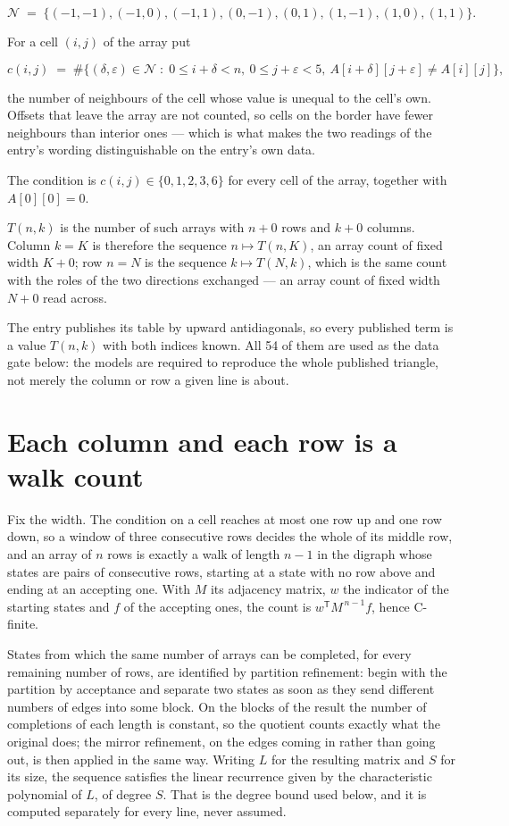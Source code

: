 \documentclass[11pt]{article}
\theoremstyle{definition}
\begin{document}
\[\mathcal{N} \;=\; \{(-1,-1), (-1,0), (-1,1), (0,-1), (0,1), (1,-1), (1,0), (1,1)\}.\]

For a cell $(i,j)$ of the array put

\[c(i,j) \;=\; \#\bigl\{(\delta,\varepsilon)\in\mathcal{N} \;:\; 0\le i+\delta<n,\ 0\le j+\varepsilon<5,\ A[i+\delta][j+\varepsilon] \neq A[i][j]\bigr\},\]

the number of neighbours of the cell whose value is unequal to the cell's own. Offsets that leave the array are not counted, so cells on the border have fewer neighbours than interior ones --- which is what makes the two readings of the entry's wording distinguishable on the entry's own data.

The condition is $c(i,j) \in \{0, 1, 2, 3, 6\}$ for every cell of the array, together with $A[0][0]=0$.

$T(n,k)$ is the number of such arrays with $n + 0$ rows and $k + 0$ columns. Column $k = K$ is therefore the sequence $n \mapsto T(n,K)$, an array count of fixed width $K + 0$; row $n = N$ is the sequence $k \mapsto T(N,k)$, which is the same count with the roles of the two directions exchanged --- an array count of fixed width $N + 0$ read across.

The entry publishes its table by upward antidiagonals, so every published term is a value $T(n,k)$ with both indices known. All 54 of them are used as the data gate below: the models are required to reproduce the whole published triangle, not merely the column or row a given line is about.

\section{Each column and each row is a walk count}

Fix the width. The condition on a cell reaches at most one row up and one row down, so a window of three consecutive rows decides the whole of its middle row, and an array of $n$ rows is exactly a walk of length $n-1$ in the digraph whose states are pairs of consecutive rows, starting at a state with no row above and ending at an accepting one. With $M$ its adjacency matrix, $w$ the indicator of the starting states and $f$ of the accepting ones, the count is $w^{\mathsf T}M^{\,n-1}f$, hence C-finite.

States from which the same number of arrays can be completed, for every remaining number of rows, are identified by partition refinement: begin with the partition by acceptance and separate two states as soon as they send different numbers of edges into some block. On the blocks of the result the number of completions of each length is constant, so the quotient counts exactly what the original does; the mirror refinement, on the edges coming in rather than going out, is then applied in the same way. Writing $L$ for the resulting matrix and $S$ for its size, the sequence satisfies the linear recurrence given by the characteristic polynomial of $L$, of degree $S$. That is the degree bound used below, and it is computed separately for every line, never assumed.
\end{document}
